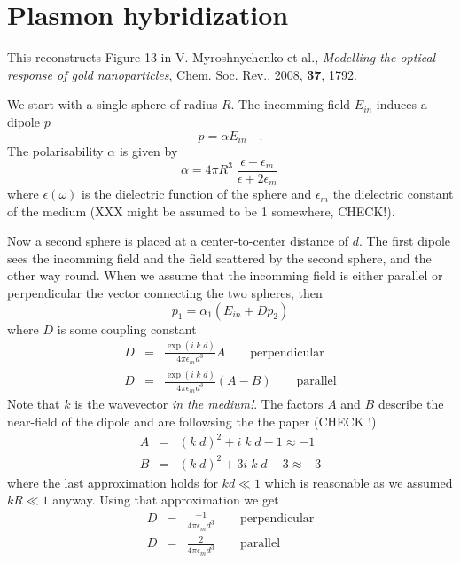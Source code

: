 


\chapter{Plasmon hybridization}


This reconstructs Figure 13 in V. Myroshnychenko et al., \textit{Modelling the
optical response of gold nanoparticles}, Chem. Soc. Rev., 2008, \textbf{37},
1792. 

We start with a single sphere of radius $R$. The incomming field $E_{in}$
induces a dipole $p$ 
\[
  p =  \alpha E_{in} \quad .
\]
The polarisability $\alpha$ is given by
 \[
  \alpha = 4 \pi R^3 \;  \frac{\epsilon - \epsilon_m}{\epsilon + 2 \epsilon_m} \,
 \]
where $\epsilon(\omega)$ is the dielectric function of the sphere and $\epsilon_m$ the
dielectric constant of the medium (XXX might be assumed to be 1 somewhere,
CHECK!).


Now a second sphere is placed at a center-to-center distance of $d$. The first
dipole sees the incomming field and the field scattered by the second sphere,
and the other way round. When we assume that the incomming field is either
parallel or perpendicular the vector connecting the two spheres, then
\[
  p_1 =  \alpha_1 \left( E_{in}  + D p_2 \right)
\]
where $D$ is some coupling constant
\begin{eqnarray}
  D & = & \frac{\exp( i \; k \; d)}{4 \pi \epsilon_m d^3}  A       \qquad
\text{perpendicular} \\
  D & = & \frac{\exp( i \; k \; d)}{4 \pi \epsilon_m d^3}  (A - B)   \qquad
\text{parallel} 
\end{eqnarray}
Note that $k$ is the wavevector \textit{in the medium!}. The factors $A$ and $B$
describe the near-field of the dipole and are followsing the the paper (CHECK !)
\begin{eqnarray}
 A &= &  (k \; d)^2 + i \;  k \; d  - 1       \approx   -1 \\
  B &=&  (k \; d)^2 + 3 i \;  k \; d  - 3    \approx   -3
\end{eqnarray}
where the last approximation holds for $kd \ll 1$ which is reasonable as we
assumed $kR \ll 1$ anyway.
Using that approximation we get
\begin{eqnarray}
  D & = & \frac{-1}{4 \pi \epsilon_m d^3}       \qquad \text{perpendicular} \\
  D & = & \frac{2}{4 \pi \epsilon_m d^3}    \qquad \text{parallel} 
\end{eqnarray}



